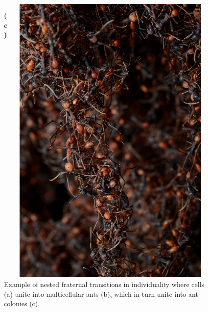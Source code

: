 \begin{figure}
\begin{columns}
\begin{column}{0.65\textwidth}
  \end{column}
  \begin{column}{0.05\textwidth}
    \cite{quinzani_2008}
  \end{column}
  \end{columns}
  \begin{columns}
  \begin{column}{0.10\textwidth}
    \textbf{(c)}
  \end{column}
  \begin{column}{0.65\textwidth}
    \includegraphics[angle=270,width=\textwidth]{img/ant_bridge}
  \end{column}
  \begin{column}{0.05\textwidth}
    \cite{gallice_2011}
  \end{column}
  \end{columns}
 \caption{
 Example of nested fraternal transitions in individuality where cells (a) unite into multicellular ants (b), which in turn unite into ant colonies (c).
 }
 \label{fig:fraternal}
\end{figure}
